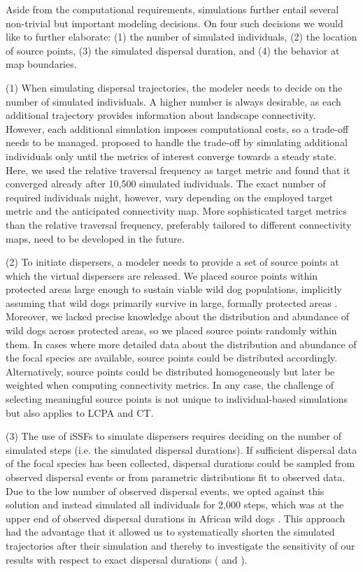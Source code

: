 \documentclass[../FinalThesis.tex]{subfiles}
\begin{document}
Aside from the computational requirements, simulations further entail several
non-trivial but important modeling decisions. On four such decisions we would
like to further elaborate: (1) the number of simulated individuals, (2) the
location of source points, (3) the simulated dispersal duration, and (4)
the behavior at map boundaries.

(1) When simulating dispersal trajectories, the modeler needs to decide on the
number of simulated individuals. A higher number is always desirable, as each
additional trajectory provides information about landscape connectivity.
However, each additional simulation imposes computational costs, so a trade-off
needs to be managed. \citet{Signer.2017} proposed to handle the trade-off by
simulating additional individuals only until the metrics of interest converge
towards a steady state. Here, we used the relative traversal frequency as target
metric and found that it converged already after 10,500 simulated individuals.
The exact number of required individuals might, however, vary depending on the
employed target metric and the anticipated connectivity map. More sophisticated
target metrics than the relative traversal frequency, preferably tailored to
different connectivity maps, need to be developed in the future.

(2) To initiate dispersers, a modeler needs to provide a set of source points at
which the virtual dispersers are released. We placed source points within
protected areas large enough to sustain viable wild dog populations, implicitly
assuming that wild dogs primarily survive in large, formally protected areas
\citep{Davies-Mostert.2012, Woodroffe.2012, VanDerMeer.2014}. Moreover, we lacked
precise knowledge about the distribution and abundance of wild dogs across
protected areas, so we placed source points randomly within them. In cases where
more detailed data about the distribution and abundance of the focal species are
available, source points could be distributed accordingly. Alternatively, source
points could be distributed homogeneously but later be weighted when computing
connectivity metrics. In any case, the challenge of selecting meaningful source
points is not unique to individual-based simulations but also applies to LCPA
and CT.

(3) The use of iSSFs to simulate dispersers requires deciding on the number of
simulated steps (i.e. the simulated dispersal durations). If sufficient
dispersal data of the focal species has been collected, dispersal durations
could be sampled from observed dispersal events or from parametric distributions
fit to observed data. Due to the low number of observed dispersal events, we
opted against this solution and instead simulated all individuals for 2,000
steps, which was at the upper end of observed dispersal durations in African
wild dogs \citep{Davies-Mostert.2012, Masenga.2016, Cozzi.2020, Hofmann.2021}.
This approach had the advantage that it allowed us to systematically shorten the
simulated trajectories after their simulation and thereby to investigate the
sensitivity of our results with respect to exact dispersal durations
( and ).
\end{document}
